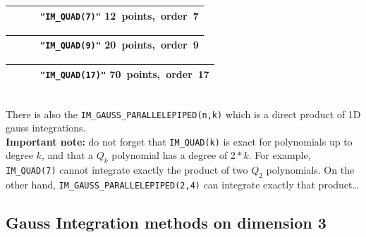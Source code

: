 \documentclass[10pt,a4paper]{article}
\begin{document}
\begin{tabular}{|m{2.5cm}|m{6cm}|m{1.2cm}|m{6.5cm}|} \hline
&&&{\tt \small "IM\_QUAD(7)"} \hspace{7em} \mbox{12 points, order 7}\hspace{7em} \\ \hline
\end{tabular}
\begin{tabular}{|m{2.5cm}|m{6cm}|m{1.2cm}|m{6.5cm}|} \hline
&&&{\tt \small "IM\_QUAD(9)"} \hspace{7em} \mbox{20 points, order 9}\hspace{7em} \\ \hline
\end{tabular}
\begin{tabular}{|m{2.5cm}|m{6cm}|m{1.2cm}|m{6.5cm}|} \hline
&&&{\tt \small "IM\_QUAD(17)"} \hspace{7em} \mbox{70 points, order 17}\hspace{7em} \\ \hline
\end{tabular}
~\\[0.2cm]

There is also the \texttt{IM\_GAUSS\_PARALLELEPIPED(n,k)} which is a direct product of 1D gauss integrations.\\

\textbf{Important note:} do not forget that \texttt{IM\_QUAD(k)} is exact for polynomials up to degree $k$, and that a $Q_k$ polynomial has a degree of $2*k$. For example, \texttt{IM\_QUAD(7)} cannot integrate exactly the product of two $Q_{2}$ polynomials. On the other hand, \texttt{IM\_GAUSS\_PARALLELEPIPED(2,4)} can integrate exactly that product\ldots

\subsection{Gauss Integration methods on dimension 3}
\end{document}
